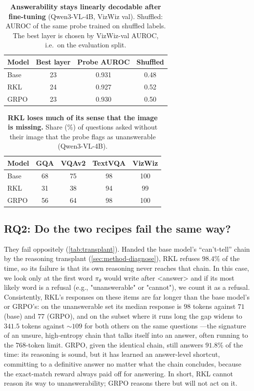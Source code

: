 \begin{table}[tb]
\centering
\small
\caption{\textbf{Answerability stays linearly decodable after fine-tuning} (Qwen3-VL-4B,
VizWiz val). Shuffled: AUROC of the same probe trained on shuffled labels. The best layer is
chosen by VizWiz-val AUROC, i.e.\ on the evaluation split.}
\label{tab:probe}
\begin{tabular}{@{}lccc@{}}
\toprule
Model & Best layer & Probe AUROC & Shuffled \\
\midrule
Base & 23 & 0.931 & 0.48 \\
RKL  & 24 & 0.927 & 0.52 \\
GRPO & 23 & 0.930 & 0.50 \\
\bottomrule
\end{tabular}
\end{table}

\begin{table}[tb]
\centering
\small
\caption{\textbf{RKL loses much of its sense that the image is missing.} Share (\%) of
questions asked without their image that the probe flags as unanswerable (Qwen3-VL-4B).}
\label{tab:probenoimg}
\begin{tabular}{@{}lcccc@{}}
\toprule
Model & GQA & VQAv2 & TextVQA & VizWiz \\
\midrule
Base & 68 & 75 & 98 & 100 \\
RKL  & 31 & 38 & 94 & 99 \\
GRPO & 56 & 64 & 98 & 100 \\
\bottomrule
\end{tabular}
\end{table}

\subsection{RQ2: Do the two recipes fail the same way?}
\label{sec:rq2}

They fail oppositely (\cref{tab:transplant}). Handed the base model's ``can't-tell''
chain by the reasoning transplant (\cref{sec:method-diagnose}), RKL refuses $98.4\%$ of the
time, so its failure is that its own reasoning never reaches that chain. In this case, we look only at the first word $\pi_\theta$ would write after <answer> and if its most likely word is a refusal (e.g., "unanswerable" or "cannot"), we count it as a refusal. Consistently, RKL's responses on these items are far longer
than the base model's or GRPO's: on the unanswerable set its median response is $98$
tokens against $71$ (base) and $77$ (GRPO), and on the subset where it runs long the gap
widens to $341.5$ tokens against ${\sim}109$ for both others on the same questions
---the signature of an unsure, high-entropy chain that talks itself into
an answer, often running to the $768$-token limit. GRPO, given the identical chain, still
answers $91.8\%$ of the time: its reasoning is sound, but it has learned an answer-level
shortcut, committing to a definitive answer no matter what the chain concludes, because the
exact-match reward always paid off for answering. In short, RKL cannot reason its way to
unanswerability; GRPO reasons there but will not act on it.

